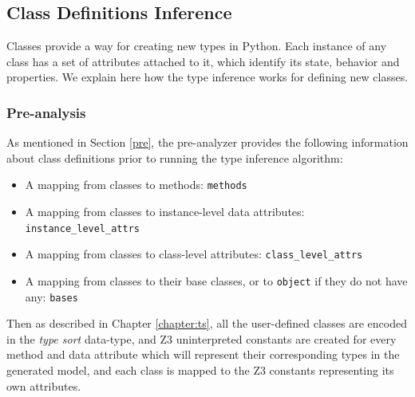 \subsection{Class Definitions Inference}
Classes provide a way for creating new types in Python. Each instance of any class has a set of attributes attached to it, which identify its state, behavior and properties. We explain here how the type inference works for defining new classes. \\

\subsubsection{Pre-analysis}
As mentioned in Section \ref{pre}, the pre-analyzer provides the following information about class definitions prior to running the type inference algorithm:
\begin{itemize}
	\item A mapping from classes to methods: \lstinline|methods|
	\item A mapping from classes to instance-level data attributes: \lstinline|instance_level_attrs|
	\item A mapping from classes to class-level attributes: \lstinline|class_level_attrs|
	\item A mapping from classes to their base classes, or to \lstinline|object| if they do not have any: \lstinline|bases|
\end{itemize}
Then as described in Chapter \ref{chapter:ts}, all the user-defined classes are encoded in the \textit{type sort} data-type, and Z3 uninterpreted constants are created for every method and data attribute which will represent their corresponding types in the generated model, and each class is mapped to the Z3 constants representing its own attributes.


